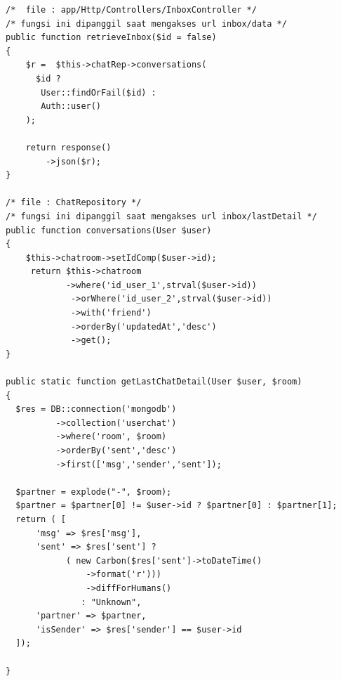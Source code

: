 \begin{lstlisting}[label=cdbe.04-05,style=php,caption=Kode Sumber \textit{Back-end} Melihat Kotak Pesan]
/*	file : app/Http/Controllers/InboxController */
/* fungsi ini dipanggil saat mengakses url inbox/data */
public function retrieveInbox($id = false)
{
    $r =  $this->chatRep->conversations(
      $id ?
       User::findOrFail($id) :
       Auth::user()
    );

    return response()
        ->json($r);
}

/* file : ChatRepository */
/* fungsi ini dipanggil saat mengakses url inbox/lastDetail */
public function conversations(User $user)
{
    $this->chatroom->setIdComp($user->id);
     return $this->chatroom
			->where('id_user_1',strval($user->id))
             ->orWhere('id_user_2',strval($user->id))
             ->with('friend')
             ->orderBy('updatedAt','desc')
             ->get();
}

public static function getLastChatDetail(User $user, $room)
{
  $res = DB::connection('mongodb')
          ->collection('userchat')
          ->where('room', $room)
          ->orderBy('sent','desc')
          ->first(['msg','sender','sent']);

  $partner = explode("-", $room);
  $partner = $partner[0] != $user->id ? $partner[0] : $partner[1];
  return ( [
      'msg' => $res['msg'],
      'sent' => $res['sent'] ?
        	( new Carbon($res['sent']->toDateTime()
	            ->format('r')))
	            ->diffForHumans() 
        	   : "Unknown",
      'partner' => $partner,
      'isSender' => $res['sender'] == $user->id
  ]);

}

\end{lstlisting}

